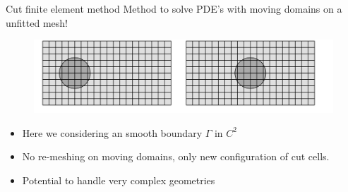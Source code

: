 \begin{frame}{Cut finite element method}
     Method to solve PDE's with moving domains on a unfitted mesh!
                \begin{figure}
                    \centering
                    \includegraphics[width=0.95 \textwidth]{figures/transformed_mesh_unfitted.png}
                \end{figure}
    \begin{block}{  }
        \begin{itemize}
            \item Here we considering an smooth boundary $\Gamma $ in $C^2$
            \item No re-meshing on moving domains, only new configuration of cut cells.
            \item Potential to handle very complex geometries
        \end{itemize}
    \end{block}

\end{frame}

